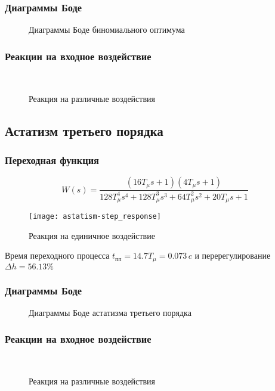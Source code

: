 			\subsubsection{Диаграммы Боде}
				\begin{figure}[H]
					\centering
					\caption{Диаграммы Боде биномиального оптимума}
				\end{figure}
			\subsubsection{Реакции на входное воздействие}
				\begin{figure}[H]
					\centering
					\\
					\centering{}
					\caption{Реакция на различные воздействия}
				\end{figure}
		\subsection{Астатизм третьего порядка}
			\subsubsection{Переходная функция}
				$$W(s)=\frac{(16T_\mu s+1)(4T_\mu s+1)}{128T_\mu^4 s^4+128T_\mu^3s^3+64T_\mu^2 s^2+20T_\mu s+1}$$    
				\begin{figure}[H]
					\centering
					\texttt{[image: astatism-step\_response]}
					\caption{Реакция на единичное воздействие}
				\end{figure} 
				Время переходного процесса $t_{\text{пп}}=14.7T_{\mu}=0.073\,c$ и перерегулирование $\Delta h=56.13\%$
			\subsubsection{Диаграммы Боде}
				\begin{figure}[H]
					\centering
					\caption{Диаграммы Боде астатизма третьего порядка}
				\end{figure}
			\subsubsection{Реакции на входное воздействие}
				\begin{figure}[H]
					\centering
					\\
					\centering{}
					\caption{Реакция на различные воздействия}
				\end{figure}
